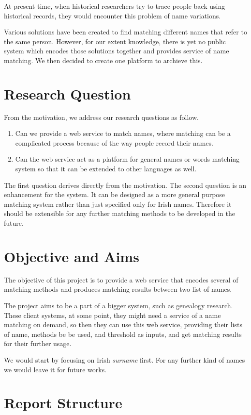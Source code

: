 At present time, when historical researchers try to trace people back
using historical records, they would encounter this problem of
name variations.

Various solutions have been created to find
matching different names that refer to the same person. However,
for our extent knowledge, there is yet no public system which encodes
those solutions together and provides service of name matching.
We then decided to create one platform to archieve this.

\pagebreak

\section{Research Question}

From the motivation, we address our research questions as follow.

\begin{enumerate}
  \item Can we provide a web service to match names, where matching can be
    a complicated process because of the way people record their names.
  \item Can the web service act as a platform for general names or words
    matching system so that it can be extended to other languages as well.
\end{enumerate}

The first question derives directly from the motivation.
The second question is an enhancement for the system. It can be designed
as a more general purpose matching system rather than just specified
only for Irish names. Therefore it should be extensible for any further
matching methods to be developed in the future.

\section{Objective and Aims}

The objective of this project is to provide a web service that
encodes several of matching methods and produces matching
results between two list of names.


The project aims to be a part of a bigger system, such as
genealogy research. These client systems, at some point,
they might need a service of a name matching on demand, so then they can use this
web service, providing their lists of name, methods be be used,
and threshold as inputs, and get matching results for their further usage.

We would start by focusing on Irish \textit{surname} first.
For any further kind of names we would leave it for future works.

\section{Report Structure}

\lipsum[11]

